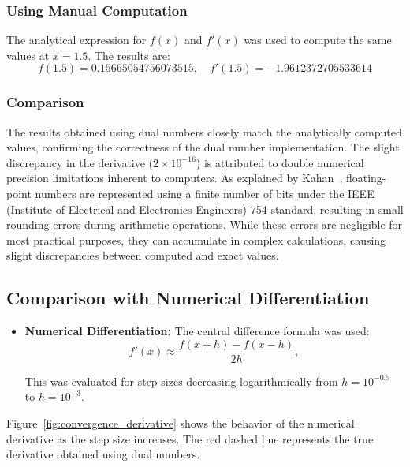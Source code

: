 \documentclass[a4paper,12pt]{article}
\begin{document}
\subsubsection{Using Manual Computation}
The analytical expression for \(f(x)\) and \(f'(x)\) was used to compute the same values at \(x = 1.5\). The results are:
\[
f(1.5) = 0.15665054756073515, \quad f'(1.5) = -1.9612372705533614
\]

\subsubsection{Comparison}
The results obtained using dual numbers closely match the analytically computed values, confirming the correctness of the dual number implementation. The slight discrepancy in the derivative (\(2 \times 10^{-16}\)) is attributed to double numerical precision limitations inherent to computers. As explained by Kahan~\cite{kahan1997ieee754}, floating-point numbers are represented using a finite number of bits under the IEEE (Institute of Electrical and Electronics Engineers) 754 standard, resulting in small rounding errors during arithmetic operations. While these errors are negligible for most practical purposes, they can accumulate in complex calculations, causing slight discrepancies between computed and exact values.


\subsection{Comparison with Numerical Differentiation}

\begin{itemize}
    \item \textbf{Numerical Differentiation:} The central difference formula was used:
    \begin{equation}
        f'(x) \approx \frac{f(x + h) - f(x - h)}{2h},
        \label{eq:central_difference}
    \end{equation}
    
    This was evaluated for step sizes decreasing logarithmically from \(h = 10^{-0.5}\) to \(h = 10^{-3}\).
\end{itemize}

Figure~\ref{fig:convergence_derivative} shows the behavior of the numerical derivative as the step size increases. The red dashed line represents the true derivative obtained using dual numbers.
\end{document}
